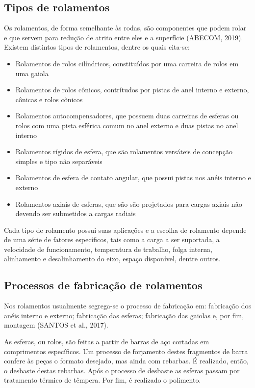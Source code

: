 \documentclass[
	12pt,				
	oneside,			
	a4paper,			
	english,			
	brazil,			
	]{abntex2ppgsi}
\begin{document}

\subsection{\textbf{Tipos de rolamentos}}

Os rolamentos, de forma semelhante às rodas, são componentes que podem rolar  e que servem para redução de atrito entre eles e a superfície (ABECOM, 2019). Existem distintos tipos de rolamentos, dentre os quais cita-se:

\begin{itemize}
	\item Rolamentos de rolos cilíndricos, constituídos por uma carreira de rolos em uma gaiola
	\item Rolamentos de rolos cônicos, contrítudos por pistas de anel interno e externo, cônicas e rolos cônicos
	\item Rolamentos autocompensadores, que possuem duas carreiras de esferas ou rolos com uma pista esférica comum no anel externo e duas pistas no anel interno 	
	\item Rolamentos rígidos de esfera, que são rolamentos versáteis de concepção simples e tipo não separáveis
	\item Rolamentos de esfera de contato angular, que possui pistas nos anéis interno e externo
	\item Rolamentos axiais de esferas, que são são projetados para cargas axiais não devendo ser submetidos a cargas radiais
\end{itemize}

Cada tipo de rolamento possui suas aplicações e a escolha de rolamento depende de uma série de fatores específicos, tais como a carga a ser suportada, a velocidade de funcionamento, temperatura de trabalho, folga interna, alinhamento e desalinhamento do eixo, espaço disponível, dentre outros. 

\subsection{\textbf{Processos de fabricação de rolamentos}}

Nos rolamentos usualmente segrega-se o processo de fabricação em: fabricação dos anéis interno e externo; fabricação das esferas; fabricação das gaiolas e, por fim, montagem (SANTOS et al., 2017).   

As esferas, ou rolos, são feitas a partir de barras de aço cortadas em comprimentos específicos. Um processo de forjamento destes fragmentos de barra confere às peças o formato desejado, mas ainda com rebarbas. É realizado, então, o desbaste destas rebarbas. Após o processo de desbaste as esferas passam por tratamento térmico de têmpera. Por fim, é realizado o polimento. 
\end{document}
